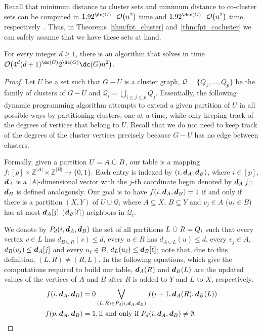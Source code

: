 Recall that minimum distance to cluster
sets and minimum distance to co-cluster sets can be computed in $1.92^{\dc( G )} \cdot \bigO{ n^2 }$
time and $1.92^{\dcc( G )} \cdot \bigO{n^2 }$ time, respectively~\cite{branching-cluster}. Thus, in Theorems~\ref{thm:fpt_cluster} and~\ref{thm:fpt_cocluster} we can safely assume that we have these sets at hand.


\begin{theorem}
    \label{thm:fpt_cluster}
    For every integer $d \geq 1$, there is an algorithm that solves  in time $\bigO{4^d(d+1)^{\dc(G)}2^{\dc(G)}\dc(G)n^2}$.
\end{theorem}

\begin{proof}
    Let $U$ be a set such that $G - U$ is a cluster graph, $\mathcal{Q} = \{Q_1, \dots, Q_p\}$ be the family of clusters of $G - U$ and $\mathcal{Q}_i = \bigcup_{i \leq j \leq p} Q_j$.
    Essentially, the following dynamic programming algorithm attempts to extend a given partition of $U$ in all possible ways by partitioning clusters, one at a time, while only keeping track of the degrees of vertices that belong to $U$.
    Recall that we do not need to keep track of the degrees of the cluster vertices precisely because $G - U$ has no edge between clusters.

    Formally, given a partition $U = A  \ \dot\cup\  B$, our table is a mapping $f : [p] \times \mathbb{Z}^{|A|} \times \mathbb{Z}^{|B|} \rightarrow \{0, 1\}$.
    Each entry is indexed by $(i, \boldsymbol{d}_A, \boldsymbol{d}_B)$, where $i \in [p]$, $\boldsymbol{d}_A$ is a $|A|$-dimensional vector with the $j$-th coordinate begin denoted by $\boldsymbol{d}_A[j]$; $\boldsymbol{d}_B$ is defined analogously.
    Our goal is to have $f(i, \boldsymbol{d}_A, \boldsymbol{d}_B) = 1$ if and only if there is a partition $(X, Y)$ of $U \cup \mathcal{Q}_i$ where $A \subseteq X$, $B \subseteq Y$ and $v_j \in A$ ($u_{\ell} \in B$) has at most $\boldsymbol{d}_A[j]$ ($\boldsymbol{d}_B[\ell]$) neighbors in $\mathcal{Q}_i$.

    We denote by $P_d(i, \boldsymbol{d}_A, \boldsymbol{d}_B)$ the set of all partitions $L  \ \dot\cup\  R = Q_i$ such that every vertex $v \in L$ has $d_{B \cup R}(v) \leq d$, every $u \in R$ has $d_{A \cup L}(u) \leq d$, every $v_j \in A$, $d_R(v_j) \leq \boldsymbol{d}_A[j]$ and every $u_{\ell} \in B$, $d_L(u_{\ell}) \leq \boldsymbol{d}_B[\ell]$; note that, due to this definition, $(L, R) \neq (R, L)$.
    In the following equations, which give the computations required to build our table, $\boldsymbol{d}_A(R)$ and $\boldsymbol{d}_B(L)$ are the updated values of the vertices of $A$ and $B$ after $R$ is added to $Y$ and $L$ to $X$, respectively.
    \begin{align}
        f(i, \boldsymbol{d}_A, \boldsymbol{d}_B) &= 0 \bigvee_{(L, R) \in P_d(i, \boldsymbol{d}_A, \boldsymbol{d}_B)} f(i+1,\boldsymbol{d}_A(R), \boldsymbol{d}_B(L))\label{eq:trans_dc}\\
        f(p, \boldsymbol{d}_A, \boldsymbol{d}_B) &= 1, \text{if and only if $P_d(i, \boldsymbol{d}_A, \boldsymbol{d}_B) \neq \emptyset$.}\label{eq:stop_dc}
    \end{align}


\end{proof}
